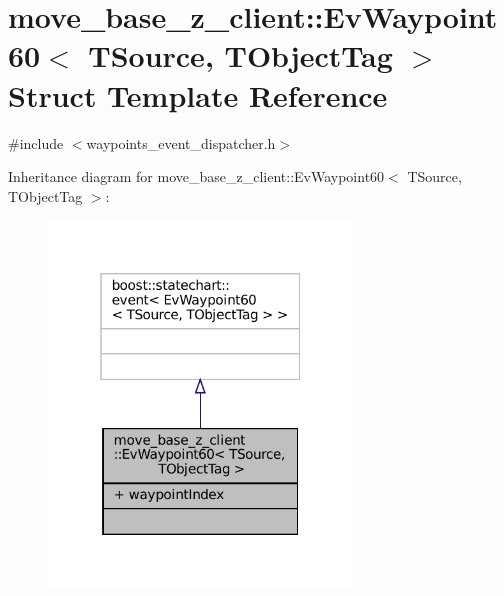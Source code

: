 \hypertarget{structmove__base__z__client_1_1EvWaypoint60}{}\section{move\+\_\+base\+\_\+z\+\_\+client\+:\+:Ev\+Waypoint60$<$ T\+Source, T\+Object\+Tag $>$ Struct Template Reference}
\label{structmove__base__z__client_1_1EvWaypoint60}


{\ttfamily \#include $<$waypoints\+\_\+event\+\_\+dispatcher.\+h$>$}



Inheritance diagram for move\+\_\+base\+\_\+z\+\_\+client\+:\+:Ev\+Waypoint60$<$ T\+Source, T\+Object\+Tag $>$\+:
\nopagebreak
\begin{figure}[H]
\begin{center}
\leavevmode
\includegraphics[width=229pt]{structmove__base__z__client_1_1EvWaypoint60__inherit__graph}
\end{center}
\end{figure}


